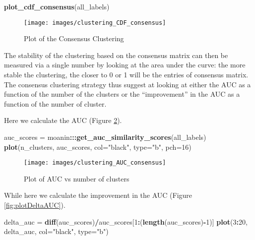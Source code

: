 \documentclass[9pt,a4paper,]{extarticle}
\newenvironment{Shaded}{\begin{snugshade}}{\end{snugshade}}
\newcommand{\DataTypeTok}[1]{\textcolor[rgb]{0.13,0.29,0.53}{#1}}
\newcommand{\DecValTok}[1]{\textcolor[rgb]{0.00,0.00,0.81}{#1}}
\newcommand{\KeywordTok}[1]{\textcolor[rgb]{0.13,0.29,0.53}{\textbf{#1}}}
\newcommand{\NormalTok}[1]{#1}
\newcommand{\OperatorTok}[1]{\textcolor[rgb]{0.81,0.36,0.00}{\textbf{#1}}}
\newcommand{\StringTok}[1]{\textcolor[rgb]{0.31,0.60,0.02}{#1}}
\begin{document}
\begin{Shaded}
\begin{Highlighting}[]
\KeywordTok{plot_cdf_consensus}\NormalTok{(all_labels)}
\end{Highlighting}
\end{Shaded}

\begin{figure}[H]

{\centering \texttt{[image: images/clustering\_CDF\_consensus]} 

}

\caption{Plot of the Consensus Clustering}\label{fig:plotCdfConsensus}
\end{figure}

The stability of the clustering based on the consensus matrix can then be
measured via a single number by looking at the area under the curve: the more
stable the clustering, the closer to 0 or 1 will be the entries of consensus
matrix. The consensus clustering strategy thus suggest at looking at either
the AUC as a function of the number of the clusters or the ``improvement'' in
the AUC as a function of the number of cluster.

Here we calculate the AUC (Figure \ref{fig:plotAUC}).

\begin{Shaded}
\begin{Highlighting}[]
\NormalTok{auc_scores =}\StringTok{ }\NormalTok{moanin}\OperatorTok{:::}\KeywordTok{get_auc_similarity_scores}\NormalTok{(all_labels)}
\KeywordTok{plot}\NormalTok{(n_clusters, auc_scores, }\DataTypeTok{col=}\StringTok{"black"}\NormalTok{, }\DataTypeTok{type=}\StringTok{"b"}\NormalTok{, }\DataTypeTok{pch=}\DecValTok{16}\NormalTok{)}
\end{Highlighting}
\end{Shaded}

\begin{figure}[H]

{\centering \texttt{[image: images/clustering\_AUC\_consensus]} 

}

\caption{Plot of AUC vs number of clusters}\label{fig:plotAUC}
\end{figure}

While here we calculate the improvement in the AUC (Figure \ref{fig:plotDeltaAUC}).

\begin{Shaded}
\begin{Highlighting}[]
\NormalTok{delta_auc =}\StringTok{ }\KeywordTok{diff}\NormalTok{(auc_scores)}\OperatorTok{/}\NormalTok{auc_scores[}\DecValTok{1}\OperatorTok{:}\NormalTok{(}\KeywordTok{length}\NormalTok{(auc_scores)}\OperatorTok{-}\DecValTok{1}\NormalTok{)]}
\KeywordTok{plot}\NormalTok{(}\DecValTok{3}\OperatorTok{:}\DecValTok{20}\NormalTok{, delta_auc, }\DataTypeTok{col=}\StringTok{"black"}\NormalTok{, }\DataTypeTok{type=}\StringTok{"b"}\NormalTok{)}
\end{Highlighting}
\end{Shaded}
\end{document}
